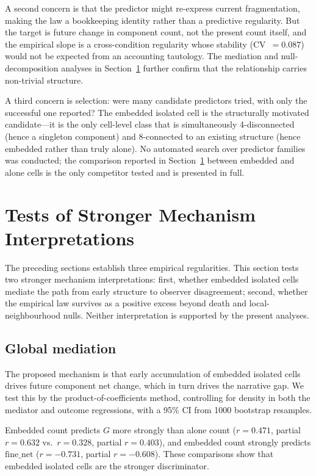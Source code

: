 \documentclass[11pt,a4paper]{article}
\newcommand{\fnet}{\mathrm{fine\_net}}
\begin{document}
A second concern is that the predictor might re-express current fragmentation,
making the law a bookkeeping identity rather than a predictive regularity.
But the target is future change in component count, not the present count
itself, and the empirical slope is a cross-condition regularity whose
stability (CV~$=0.087$) would not be expected from an accounting tautology.
The mediation and null-decomposition analyses in Section~\ref{sec:mechanism}
further confirm that the relationship carries non-trivial structure.

A third concern is selection: were many candidate predictors tried, with only
the successful one reported?
The embedded isolated cell is the structurally motivated candidate---it is the
only cell-level class that is simultaneously 4-disconnected (hence a singleton
component) and 8-connected to an existing structure (hence embedded rather than
truly alone).
No automated search over predictor families was conducted; the comparison
reported in Section~\ref{sec:mechanism} between embedded and alone cells is
the only competitor tested and is presented in full.

\section{Tests of Stronger Mechanism Interpretations}
\label{sec:mechanism}

The preceding sections establish three empirical regularities.
This section tests two stronger mechanism interpretations: first, whether
embedded isolated cells mediate the path from early structure to observer
disagreement; second, whether the empirical law survives as a positive excess
beyond death and local-neighbourhood nulls.
Neither interpretation is supported by the present analyses.

\subsection{Global mediation}

The proposed mechanism is that early accumulation of embedded isolated cells
drives future component net change, which in turn drives the narrative gap.
We test this by the product-of-coefficients method, controlling for density
in both the mediator and outcome regressions, with a 95\% CI from 1000
bootstrap resamples.

Embedded count predicts $G$ more strongly than alone count
($r=0.471$, partial $r=0.632$ vs.\ $r=0.328$, partial $r=0.403$),
and embedded count strongly predicts $\fnet$
($r=-0.731$, partial $r=-0.608$).
These comparisons show that embedded isolated cells are the stronger
discriminator.
\end{document}
